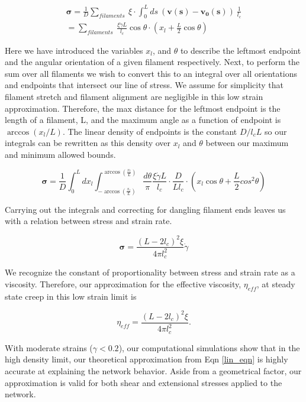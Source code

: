 \documentclass[pre,reprint]{revtex4-1}
\begin{document}
\begin{multline}
\mathbf{\sigma} =  \frac{1}{D}\sum_{filaments}\:  \xi \cdot \int_0^L ds \: (\mathbf{v(s)}-\mathbf{v_0(s)}) \:\frac{1}{l_c} \\
 = \sum_{filaments}\:  \frac{\xi \dot \gamma L}{l_c} \cos \theta \cdot (x_l + \frac{L}{2} \cos \theta)
\end{multline}

Here we have introduced the variables $x_l$, and $\theta$ to describe the leftmost endpoint and the angular orientation of a given filament respectively.  Next, to perform the sum over all filaments we wish to convert this to an integral over all orientations and endpoints that intersect our line of stress. We assume for simplicity that filament stretch and filament alignment are negligible in this low strain approximation.  Therefore, the max distance for the leftmost endpoint is the length of a filament, L, and the maximum angle as a function of endpoint is $\arccos(x_l/L)$.  The linear density of endpoints is the constant $D/l_cL$ so our integrals can be rewritten as this density over $x_l$ and $\theta$ between our maximum and minimum allowed bounds.

\begin{equation}
\mathbf{\sigma} =  \frac{1}{D} \int_0^L dx_l \int_{-\arccos (\frac{x_l}{L})}^{\arccos (\frac{x_l}{L})}\frac{d\theta}{\pi} \frac{\xi \dot \gamma L}{l_c} \cdot \frac{D}{Ll_c}\cdot (x_l \cos \theta + \frac{L}{2} cos^2\theta)
\end{equation}

Carrying out the integrals and correcting for dangling filament ends leaves us with a relation between stress and strain rate.

\begin{equation}
\mathbf{\sigma} = \frac{(L-2l_c)^2 \xi}{4\pi l_c^2} \dot \gamma 
\end{equation}

We recognize the constant of proportionality between stress and strain rate as a viscosity.  Therefore, our approximation for the effective viscosity, $\eta_{eff}$, at steady state creep in this low strain limit is

\begin{equation}
\label{lin_eqn}
\eta_{eff} = \frac{(L-2l_c)^2 \xi}{4\pi l_c^2} .
\end{equation}

With moderate strains ($\gamma<0.2$), our computational simulations show that in the high density limit, our theoretical approximation from Eqn \ref{lin_eqn} is highly accurate at explaining the network behavior.  Aside from a geometrical factor, our approximation is valid for both shear and extensional stresses applied to the network.
\end{document}
